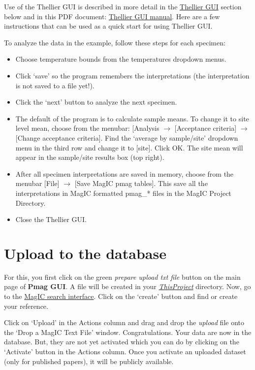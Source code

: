 \documentclass[11pt]{book}
\begin{document}
{Use of the Thellier GUI is described in more detail in the \href{#thellier_GUI.py}{Thellier GUI} section below and in this PDF document: \href{https://github.com/PmagPy/PmagPy-Cookbook/blob/gh-pages/thellier_GUI_full_manual.pdf}{Thellier GUI manual}. Here are a few instructions that can be used as a quick start for using Thellier GUI.

To analyze the data in the example, follow these steps for each specimen:
 \begin{itemize}
\item Choose temperature bounds from the temperatures dropdown menus.
\item  Click `save' so the program remembers the interpretations (the interpretation is not saved to a file yet!).
\item  Click the `next' button to analyze the next specimen.
\item The default of the program is to calculate sample means. To change it to site level mean, choose from the menubar: [Analysis $\rightarrow$ [Acceptance criteria] $\rightarrow$  [Change acceptance criteria]. Find the `average by sample/site' dropdown menu in the third row and change it to [site]. Click OK. The site mean will appear in the sample/site results box (top right).
\item  After all specimen interpretations are saved in memory, choose from the menubar [File] $\rightarrow$ [Save MagIC pmag tables]. This save all the interpretations in MagIC formatted pmag\_* files in the MagIC Project Directory.
\item  Close the Thellier GUI.
\end{itemize}


\section{Upload to the database }

For this, you first click on the green {\it prepare upload txt file} button on the main page of {\bf Pmag GUI}. A file will be created in your \href{#Project_Directory}{\it ThisProject} directory.  Now, go to the  \href{http://earthref.org/MAGIC/search}{MagIC search interface}.      Click on the `create' button and find or create your reference.

Click on `Upload' in the Actions column and   drag and drop the {\it upload}   file onto the  `Drop a MagIC Text File' window.
Congratulations. Your data are now in the database.  But, they are not yet activated which you can do by clicking on the `Activate' button in the Actions column.  Once you activate an uploaded dataset (only for published papers), it will be publicly available.

}
\end{document}
